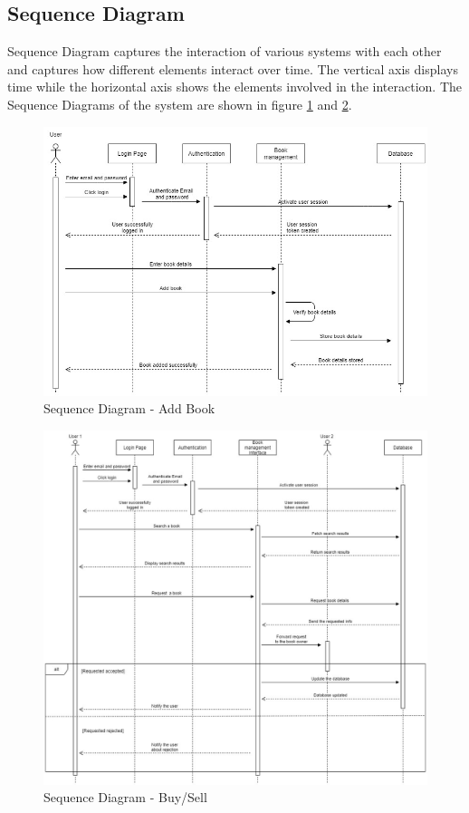 \documentclass[conference]{IEEEtran}
\begin{document}
\subsection{Sequence Diagram}
Sequence Diagram captures the interaction of various systems with each other and captures how different elements interact over time. The vertical axis displays time while the horizontal axis shows the elements involved in the interaction. The Sequence Diagrams of the system are shown in figure \ref{fig:sequencediagramaddbook} and \ref{fig:sequencediagrambuysell}.
\begin{figure}[H]
     \centering
     \includegraphics[scale=0.20,margin=2,frame]{Sequence Diagram-Add Book.jpg}
     \caption{Sequence Diagram - Add Book}
     \label{fig:sequencediagramaddbook}
 \end{figure}
 \begin{figure}[H]
     \centering
     \includegraphics[scale=0.20,margin=2,frame]{Sequence Diagram-Buy_Sell.jpg}
     \caption{Sequence Diagram - Buy/Sell}
     \label{fig:sequencediagrambuysell}
 \end{figure}
\end{document}
